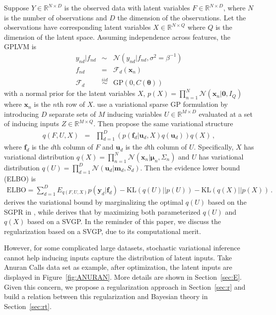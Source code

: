 \documentclass{article}
\begin{document}
Suppose $Y \in \mathbb{R}^{N\times D}$ is the observed data with latent variables $F \in \mathbb{R}^{N\times D}$, where $N$ is the number of observations and $D$ the dimension of the observations. Let the observations have corresponding latent variables $X \in \mathbb{R}^{N \times Q}$ where $Q$ is the dimension of the latent space. Assuming independence across features, the GPLVM is 
\begin{eqnarray}
y_{nd}|f_{nd} & \sim & \mathcal{N}(y_{nd}|f_{nd}, \sigma^2 = \beta^{-1}) \nonumber \\
f_{nd} & = & \mathcal{F}_d(\bm x_n) \nonumber \\
\mathcal{F}_d & \stackrel{iid}{\sim} & \mathrm{GP}(0, C(\bm\theta)) 
\label{GPLVM}
\end{eqnarray}
with a normal prior for the latent variables $X$, 
$p(X) = \prod_{n = 1}^{N}\mathcal{N}(\bm x_n|\bm 0, I_Q)$
where $\bm x_n$ is the $n$th row of $X$. \cite{Titsias_2009, Titsias_2010} use a variational sparse GP formulation by introducing $D$ separate sets of $M$ inducing variables $U \in \mathbb{R}^{M\times D}$ evaluated at a set of inducing inputs $Z\in\mathbb{R}^{M\times Q}$. Then \cite{Titsias_2010, Hensman_2013} propose the same variational structure 
\begin{eqnarray}
q(F, U, X) & = & \prod_{d = 1}^D\left(p(\bm f_d| \bm u_d, X) q(\bm u_d)\right) q(X)\,,
\label{GPLVM_VD}
\end{eqnarray}
where $\bm f_d$ is the $d$th column of $F$ and $\bm u_d$ is the $d$th column of $U$. Specifically, $X$ has variational distribution $q(X) = \prod_{n = 1}^N\mathcal{N}(\bm x_n|\bm \mu_n, \Sigma_n)$ and $U$ has variational distribution $q(U) = \prod_{d = 1}^D\mathcal{N}(\bm u_d| \bm m_d, S_d)$. 
Then the evidence lower bound (ELBO) is 
\begin{eqnarray}
\mathrm{ELBO} = \sum_{d = 1}^{D}E_{q(F, U, X)}p(\bm y_d|\bm f_d) - \mathrm{KL}(q(U)||p(U)) - \mathrm{KL}(q(X)||p(X)) \,.
\end{eqnarray}	
\cite{Titsias_2010} derives the variational bound by marginalizing the optimal $q(U)$ based on the SGPR in \cite{Titsias_2009}, while \cite{Hensman_2013} derives that by maximizing both parameterized $q(U)$ and $q(X)$ based on a SVGP. In the reminder of this paper, we discuss the regularization based on a SVGP, due to its computational merit. 

However, for some complicated large datasets, stochastic variational inference cannot help inducing inputs capture the distribution of latent inputs. Take Anuran Calls data set as example, after optimization, the latent inputs are displayed in Figure~\ref{fig:ANURAN}. More details are shown in Section~\ref{sec:E}. 
Given this concern, we propose a regularization approach in Section~\ref{sec:r} and build a relation between this regularization and Bayesian theory in Section~\ref{sec:rt}.
\end{document}
